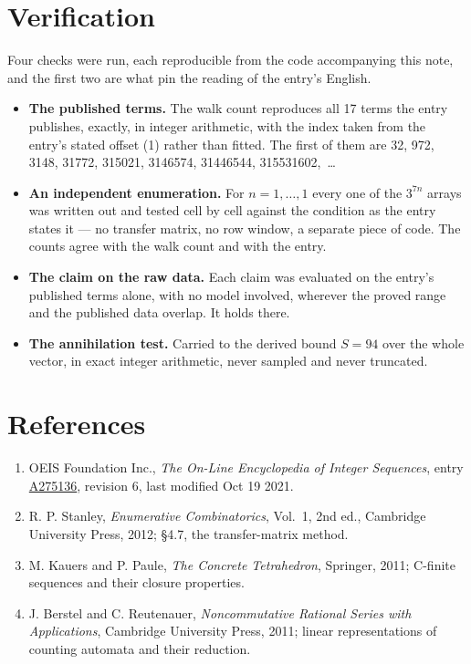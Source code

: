 \documentclass[11pt]{article}
\theoremstyle{definition}
\begin{document}
\section{Verification}

Four checks were run, each reproducible from the code accompanying this note, and the first two are what pin the reading of the entry's English.

\begin{itemize}

\item {\bfseries The published terms.} The walk count reproduces all 17 terms the entry publishes, exactly, in integer arithmetic, with the index taken from the entry's stated offset (1) rather than fitted. The first of them are 32, 972, 3148, 31772, 315021, 3146574, 31446544, 315531602,~\dots

\item {\bfseries An independent enumeration.} For $n = 1,\dots,1$ every one of the $3^{7n}$ arrays was written out and tested cell by cell against the condition as the entry states it --- no transfer matrix, no row window, a separate piece of code. The counts agree with the walk count and with the entry.

\item {\bfseries The claim on the raw data.} Each claim was evaluated on the entry's published terms alone, with no model involved, wherever the proved range and the published data overlap. It holds there.

\item {\bfseries The annihilation test.} Carried to the derived bound $S = 94$ over the whole vector, in exact integer arithmetic, never sampled and never truncated.

\end{itemize}

\section{References}

\begin{enumerate}

\item OEIS Foundation Inc., \emph{The On-Line Encyclopedia of Integer Sequences}, entry \href{https://oeis.org/A275136}{A275136}, revision 6, last modified Oct 19 2021.

\item R. P. Stanley, \emph{Enumerative Combinatorics}, Vol.~1, 2nd ed., Cambridge University Press, 2012; \S4.7, the transfer-matrix method.

\item M. Kauers and P. Paule, \emph{The Concrete Tetrahedron}, Springer, 2011; C-finite sequences and their closure properties.

\item J. Berstel and C. Reutenauer, \emph{Noncommutative Rational Series with Applications}, Cambridge University Press, 2011; linear representations of counting automata and their reduction.

\end{enumerate}
\end{document}
